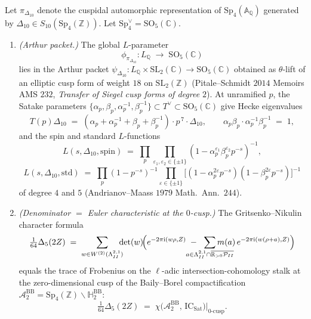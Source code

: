 \begin{theorem}
\label{thm:qgfnd-delta10-arthur-euler}
Let $\pi_{\Delta_{10}}$ denote the cuspidal automorphic representation
of $\mathrm{Sp}_4(\mathbb A_{\mathbb Q})$ generated by
$\Delta_{10}\in S_{10}(\mathrm{Sp}_4(\mathbb Z))$. Let
$\mathrm{Sp}_4^{\vee}=\mathrm{SO}_5(\mathbb C)$.
\begin{enumerate}[label=(\alph*),leftmargin=1.5em]
 \item \emph{(Arthur packet.)} The global $L$-parameter
 \[
 \phi_{\pi_{\Delta_{10}}}\colon L_{\mathbb Q}\;\longrightarrow\;\mathrm{SO}_5(\mathbb C)
 \]
 lies in the Arthur packet
 $\psi_{\Delta_{10}}\colon L_{\mathbb Q}\times\mathrm{SL}_2(\mathbb C)\to\mathrm{SO}_5(\mathbb C)$
 obtained as $\theta$-lift of an elliptic cusp form of weight
 $18$ on $\mathrm{SL}_2(\mathbb Z)$ (Pitale--Schmidt $2014$
 Memoirs AMS $232$, \emph{Transfer of Siegel cusp forms of degree
 $2$}). At unramified $p$, the Satake parameters
 $\{\alpha_p,\beta_p,\alpha_p^{-1},\beta_p^{-1}\}\subset T^{\vee}\subset\mathrm{SO}_5(\mathbb C)$
 give Hecke eigenvalues
 \[
 T(p)\Delta_{10}\;=\;(\alpha_p+\alpha_p^{-1}+\beta_p+\beta_p^{-1})\cdot p^{\,7}\cdot\Delta_{10},
 \qquad \alpha_p\beta_p\cdot\alpha_p^{-1}\beta_p^{-1}\;=\;1,
 \]
 and the spin and standard $L$-functions
 \[
 L(s,\Delta_{10},\mathrm{spin})\;=\;\prod_p\!\!\prod_{\varepsilon_1,\varepsilon_2\in\{\pm 1\}}\!\!(1-\alpha_p^{\varepsilon_1}\beta_p^{\varepsilon_2}p^{-s})^{-1},
 \]
 \[
 L(s,\Delta_{10},\mathrm{std})\;=\;\prod_p(1-p^{-s})^{-1}\!\!\prod_{\varepsilon\in\{\pm 1\}}\!\!\bigl[(1-\alpha_p^{2\varepsilon}p^{-s})(1-\beta_p^{2\varepsilon}p^{-s})\bigr]^{-1}
 \]
 of degree $4$ and $5$ (Andrianov--Maass $1979$ Math.\ Ann.\ $244$).
 \item \emph{(Denominator $=$ Euler characteristic at the $0$-cusp.)}
 The Gritsenko--Nikulin character formula
 \[
 \tfrac{1}{64}\Delta_5(2Z)\;=\;\sum_{w\in W^{(2)}(\Lambda^{2,1}_{II})}\!\!\!\!\det(w)\!\Bigl(e^{-2\pi\mathrm i(w\rho,Z)}\;-\;\!\!\!\!\!\!\!\!\!\!\!\sum_{a\in\Lambda^{2,1}_{II}\cap\overline{\mathbb R_{>0}\mathcal P_{II}}}\!\!\!\!\!\!\!\!\!\!\!\!\!m(a)\,e^{-2\pi\mathrm i(w(\rho+a),Z)}\Bigr)
 \]
 equals the trace of Frobenius on the $\ell$-adic
 intersection-cohomology stalk at the zero-dimensional cusp of the
 Baily--Borel compactification
 $\mathcal A_2^{\mathrm{BB}}=\mathrm{Sp}_4(\mathbb Z)\backslash\mathbb H_2^{\mathrm{BB}}$:
 \[
 \tfrac{1}{64}\Delta_5(2Z)\;=\;\chi\bigl(\mathcal A_2^{\mathrm{BB}},\,\mathrm{IC}_{\mathrm{Sat}}\bigr)\Big|_{0\text{-cusp}}.
 \]
\end{enumerate}
\end{theorem}

